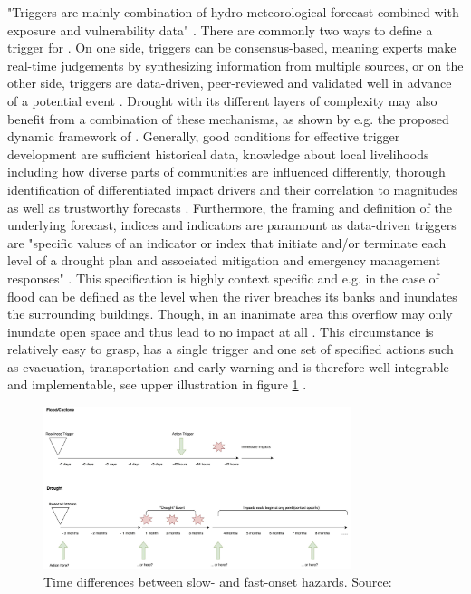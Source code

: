 "Triggers are mainly combination of hydro-meteorological forecast combined with exposure and vulnerability data" \autocite[19]{rcrcForecastbasedFinancingEarly2020}. There are commonly two ways to define a trigger for . On one side, triggers can be consensus-based, meaning experts make real-time judgements by synthesizing information from multiple sources, or on the other side, triggers are data-driven, peer-reviewed and validated well in advance of a potential event \autocite{rcrcForecastbasedFinancingEarly2020}. Drought with its different layers of complexity may also benefit from a combination of these mechanisms, as shown by e.g. the proposed dynamic framework of \autocite{boultDroughtImpactbasedForecasting2022}. Generally, good conditions for effective trigger development are sufficient historical data, knowledge about local livelihoods including how diverse parts of communities are influenced differently, thorough identification of differentiated impact drivers and their correlation to magnitudes as well as trustworthy forecasts \autocite{coughlandeperezForecastbasedFinancingApproach2015,coughlandeperezActionbasedFloodForecasting2016,stephensFORECASTBASEDACTION2015,harrowsmithFutureForecastImpact2020,rcrcForecastbasedFinancingEarly2020}.\newline
Furthermore, the framing and definition of the underlying forecast, indices and indicators are paramount as data-driven triggers are "specific values of an indicator or index that initiate and/or terminate each level of a drought plan and associated mitigation and emergency management responses" \autocites[13]{svobodaHandbookDroughtIndicators2016}. This specification is highly context specific and e.g. in the case of flood can be defined as the level when the river breaches its banks and inundates the surrounding buildings. Though, in an inanimate area this overflow may only inundate open space and thus lead to no impact at all \autocite{stephensFORECASTBASEDACTION2015}. This circumstance is relatively easy to grasp, has a single trigger and one set of specified actions such as evacuation, transportation and early warning and is therefore well integrable and implementable, see upper illustration in figure \ref{fig:th_slow_onset} \autocite{siahaanForecastbasedActionDREF2018}. 

\begin{figure}[!htp]
    \centering
    \includegraphics[width=0.8\textwidth]{figures/2023_MA_th_slow_onset.jpg}
    \decoRule
    \caption[Time Differences between slow- and fast-onset Hazards]{Time differences between slow- and fast-onset hazards. Source: \textcite{rcrcForecastbasedFinancingEarly2020}}
    \label{fig:th_slow_onset}
\end{figure}

